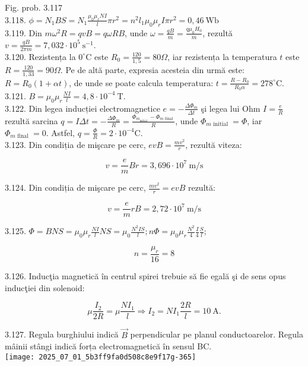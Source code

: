 Fig. prob. 3.117\\
3.118. $\phi=N_{1} B S=N_{1} \frac{\mu_{0} \mu_{r} N I}{l} \pi r^{2}=n^{2} l_{1} \mu_{0} \mu_{r} I \pi r^{2}=0,46 \mathrm{~Wb}$\\
3.119. Din $m \omega^{2} R=q v B=q \omega R B$, unde $\omega=\frac{q B}{m}=\frac{q \mu_{0} H_{0}}{m}$, rezultă $v=\frac{q B}{2 \pi m}=7,032 \cdot 10^{5} \mathrm{~s}^{-1}$.\\
3.120. Rezistența la $0^{\circ} \mathrm{C}$ este $R_{0}=\frac{120}{1,5}=80 \Omega$, iar rezistența la temperatura $t$ este $R=\frac{120}{1,33}=90 \Omega$. Pe de altă parte, expresia acesteia din urmă este: $R=R_{0}(1+\alpha t)$, de unde se poate calcula temperatura: $t=\frac{R-R_{0}}{R_{0} \alpha}=278^{\circ} \mathrm{C}$.\\
3.121. $B=\mu_{0} \mu_{r} \frac{N I}{l}=4,8 \cdot 10^{-4} \mathrm{~T}$.\\
3.122. Din legea inducției electromagnetice $e=-\frac{\Delta \Phi_{m}}{\Delta t}$ şi legea lui Ohm $I=\frac{e}{R}$ rezultă sarcina $q=I \Delta t=-\frac{\Delta \Phi_{m}}{R}=\frac{\Phi_{m_{\text {initial }}}-\Phi_{m \text { final }}}{R}$, unde $\Phi_{m \text { initial }}=\Phi$, iar $\Phi_{m \text { final }}=0$. Astfel, $q=\frac{\Phi}{R}=2 \cdot 10^{-4} \mathrm{C}$.\\
3.123. Din condiția de mişcare pe cerc, $e v B=\frac{m v^{2}}{r}$, rezultă viteza:

$$
v=\frac{e}{m} B r=3,696 \cdot 10^{7} \mathrm{~m} / \mathrm{s}
$$

3.124. Din condiția de mişcare pe cerc, $\frac{m v^{2}}{r}=e v B$ rezultă:

$$
v=\frac{e}{m} r B=2,72 \cdot 10^{7} \mathrm{~m} / \mathrm{s}
$$

3.125. $\Phi=B N S=\mu_{0} \mu_{r} \frac{N I}{l} N S=\mu_{0} \frac{N^{2} I S}{l} ; n \Phi=\mu_{0} \mu_{r} \frac{N^{2}}{4} \frac{I}{4} \frac{S}{l}$;

$$
n=\frac{\mu_{r}}{16}=8
$$

3.126. Inducţia magnetică în centrul spirei trebuie să fie egală şi de sens opus inducţiei din solenoid:

$$
\mu \frac{I_{2}}{2 R}=\mu \frac{N I_{1}}{l} \Rightarrow I_{2}=N I_{1} \frac{2 R}{l}=10 \mathrm{~A} .
$$

3.127. Regula burghiului indică $\vec{B}$ perpendicular pe planul conductoarelor. Regula mâinii stângi indică forța electromagnetică în sensul BC.\\
\texttt{[image: 2025\_07\_01\_5b3ff9fa0d508c8e9f17g-365]}

